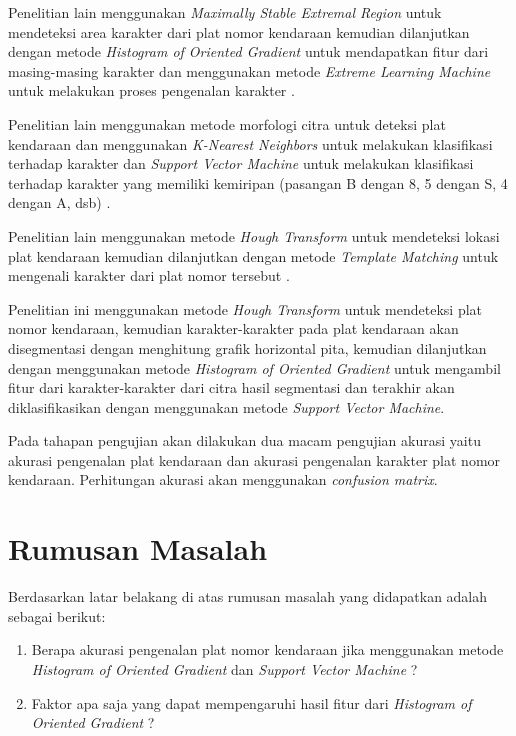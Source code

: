\noindent Penelitian lain menggunakan \textit{Maximally Stable Extremal Region} untuk mendeteksi area karakter dari plat nomor kendaraan kemudian dilanjutkan dengan metode \textit{Histogram of Oriented Gradient} untuk mendapatkan fitur dari masing-masing karakter dan menggunakan metode \textit{Extreme Learning Machine} untuk melakukan proses pengenalan karakter \cite{gou2014}.

\noindent Penelitian lain menggunakan metode morfologi citra untuk deteksi plat kendaraan dan menggunakan \textit{K-Nearest Neighbors} untuk melakukan klasifikasi terhadap karakter dan \textit{Support Vector Machine} untuk melakukan klasifikasi terhadap karakter yang memiliki kemiripan (pasangan B dengan 8, 5 dengan S, 4 dengan A, dsb) \cite{tabrizi}.

\noindent Penelitian lain menggunakan metode \textit{Hough Transform} untuk mendeteksi lokasi plat kendaraan kemudian dilanjutkan dengan metode \textit{Template Matching} untuk mengenali karakter dari plat nomor tersebut \cite{rasheed}. 

\noindent Penelitian ini menggunakan metode  \textit{Hough Transform} untuk mendeteksi plat nomor kendaraan, kemudian karakter-karakter pada plat kendaraan akan disegmentasi dengan menghitung grafik horizontal pita, kemudian dilanjutkan dengan menggunakan metode \textit{Histogram of Oriented Gradient} untuk mengambil fitur dari karakter-karakter dari citra hasil segmentasi dan terakhir akan diklasifikasikan dengan menggunakan metode \textit{Support Vector Machine}.

\noindent Pada tahapan pengujian akan dilakukan dua macam pengujian akurasi yaitu akurasi pengenalan plat kendaraan dan akurasi pengenalan karakter plat nomor kendaraan. Perhitungan akurasi akan menggunakan \textit{confusion matrix}.\\

\section{Rumusan Masalah}
\noindent Berdasarkan latar belakang di atas rumusan masalah yang didapatkan adalah sebagai berikut:
\begin{enumerate}[nolistsep,leftmargin=0.5cm]
\item Berapa akurasi pengenalan plat nomor kendaraan jika menggunakan metode \textit{Histogram of Oriented Gradient} dan \textit{Support Vector Machine} ?
\item Faktor apa saja yang dapat mempengaruhi hasil fitur dari \textit{Histogram of Oriented Gradient} ? \\
\end{enumerate}

